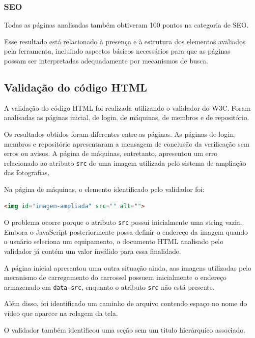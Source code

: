 \subsubsection{SEO}

Todas as páginas analisadas também obtiveram 100 pontos na categoria de SEO.

Esse resultado está relacionado à presença e à estrutura dos elementos avaliados pela ferramenta, incluindo aspectos básicos necessários para que as páginas possam ser interpretadas adequadamente por mecanismos de busca.
\vspace{5mm}
\subsection{Validação do código HTML}

A validação do código HTML foi realizada utilizando o validador do W3C. Foram analisadas as páginas inicial, de login, de máquinas, de membros e de repositório.

Os resultados obtidos foram diferentes entre as páginas. As páginas de login, membros e repositório apresentaram a mensagem de conclusão da verificação sem erros ou avisos. A página de máquinas, entretanto, apresentou um erro relacionado ao atributo \texttt{src} de uma imagem utilizada pelo sistema de ampliação das fotografias.

Na página de máquinas, o elemento identificado pelo validador foi:

\begin{lstlisting}[language=HTML] <img id="imagem-ampliada" src="" alt="">
\end{lstlisting}

O problema ocorre porque o atributo \texttt{src} possui inicialmente uma string vazia. Embora o JavaScript posteriormente possa definir o endereço da imagem quando o usuário seleciona um equipamento, o documento HTML analisado pelo validador já contém um valor inválido para essa finalidade.

A página inicial apresentou uma outra situação ainda, aas imagens utilizadas pelo mecanismo de carregamento do carrossel possuem inicialmente o endereço armazenado em \texttt{data-src}, enquanto o atributo \texttt{src} não está presente.

Além disso, foi identificado um caminho de arquivo contendo espaço no nome do vídeo que aparece na rolagem da tela.

O validador também identificou uma seção sem um título hierárquico associado.

